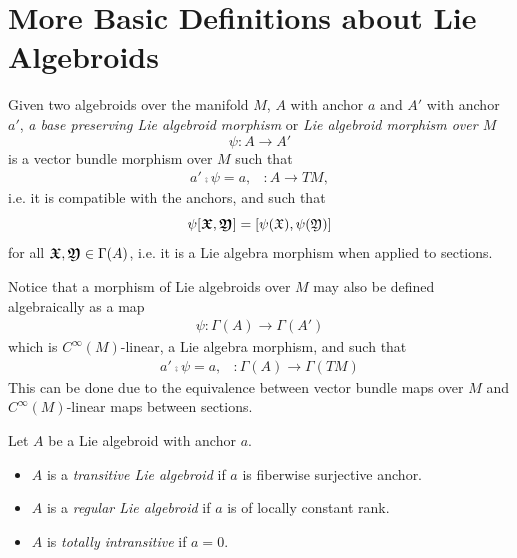 \section{More Basic Definitions about Lie Algebroids}
\begin{definition}  \label{defnMorph}
Given two algebroids over the manifold $M$, $A$ with anchor $a$ and $A'$ with anchor $a'$, \emph{a base preserving Lie algebroid morphism} or \emph{Lie algebroid morphism over $M$} 
\[\psi: A \to A'\]
is a vector bundle morphism over $M$ such that 
\begin{align}
    a' \comp \psi = a, & : A \to TM,
\end{align}
i.e. it is compatible with the anchors, and such that 
\[\psi[\bm{\mathfrak{X}}, \bm{\mathfrak{Y}}] = [\psi(\mathfrak{X}), \psi(\mathfrak{Y})]\] 
for all $\bm{\mathfrak{X}}, \bm{\mathfrak{Y}} \in \Gamma(A)$, i.e. it is a Lie algebra morphism when applied to sections. 
\end{definition}

\begin{remark}
Notice that a morphism of Lie algebroids over $M$ may also be defined algebraically as a map
\begin{align*}
    \psi: \Gamma(A) \to \Gamma(A')
\end{align*}
which is $C^\infty(M)$-linear, a Lie algebra morphism, and such that
\begin{align*}
    a' \comp \psi = a, & :\Gamma(A) \to \Gamma(TM)
\end{align*}
This can be done due to the equivalence between vector bundle maps over $M$ and $C^\infty(M)$-linear maps between sections.
\end{remark}

\begin{definition}
    Let $A$ be a Lie algebroid with anchor $a$.
    
    \begin{itemize}
    
    \item $A$ is a \emph{transitive Lie algebroid} if $a$ is fiberwise surjective anchor.
    
    \item $A$ is a \emph{regular Lie algebroid} if $a$ is of locally constant rank.
    
    \item $A$ is \emph{totally intransitive} if $a = 0$.
    
    \end{itemize}
    
\end{definition}

